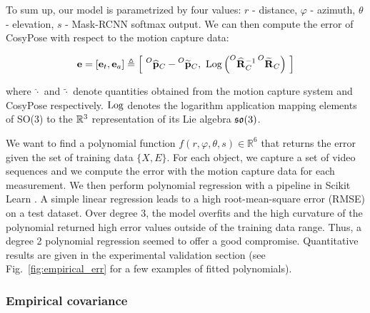 To sum up, our model is parametrized by four values: $r$ - distance, $\varphi$ - azimuth, $\theta$ - elevation, $s$ - Mask-RCNN softmax output. 
We can then compute the error of CosyPose with respect to the motion capture data: 

\begin{equation}
    \mathbf{e}  = [\mathbf{e}_{t}, \mathbf{e}_{a}]  \triangleq  \left[~\prescript{O}{}{\widehat{{\bf p}}}_{C} - \prescript{O}{}{\widetilde{{\bf p}}}_{C}, ~ \operatorname*{Log} \left(\prescript{O}{}{\widehat{{\bf R}}}_{C}^{-1}\prescript{O}{}{\widetilde{{\bf R}}}_{C}\right)~\right]
\end{equation}

where $\widehat{\cdot}$ and $\widetilde{\cdot}$ denote quantities obtained from the motion capture system and CosyPose respectively. 
$\operatorname*{Log}$ denotes the logarithm application mapping elements of SO(3) to the $\mathbb{R}^3$ representation of its Lie algebra 
${\mathfrak {so}}(3)$.

We want to find a polynomial function $f(r, \varphi, \theta, s) \in \mathbb{R}^6$ that returns the error given the set of training data $\{X,E\}$. 
For each object, we capture a set of video sequences and we compute the error with the motion capture data for each measurement. 
We then perform polynomial regression with a pipeline in Scikit Learn \cite{scikit-learn}. A simple linear regression leads to a high root-mean-square error (RMSE) 
on a test dataset. Over degree 3, the model overfits and the high curvature of the polynomial returned high error values outside of the training data range. 
Thus, a degree 2 polynomial regression seemed to offer a good compromise.  Quantitative results are given in the experimental validation section 
(see Fig.~\ref{fig:empirical_err} for a few examples of fitted polynomials).


\subsubsection{Empirical covariance}

